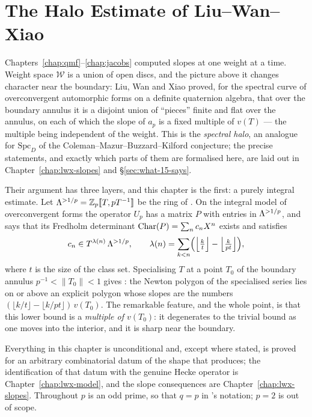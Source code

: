 \chapter{The Halo Estimate of Liu--Wan--Xiao}
\label{chap:lwx-halo}

Chapters~\ref{chap:qmf}--\ref{chap:jacobs} computed slopes at one weight at a time.  Weight space
$\mathcal{W}$ is a union of open discs, and the picture above it changes character near the
boundary: Liu, Wan and Xiao \cite{LWX} proved, for the spectral curve of overconvergent
automorphic forms on a definite quaternion algebra, that over the boundary annulus it is a
disjoint union of ``pieces'' finite and flat over the annulus, on each of which the slope of
$a_p$ is a fixed multiple of $v(T)$ --- the multiple being independent of the weight.  This is
the \emph{spectral halo}, an analogue for $\mathrm{Spc}_D$ of the Coleman--Mazur--Buzzard--Kilford
conjecture; the precise statements, and exactly which parts of them are formalised here, are
laid out in Chapter~\ref{chap:lwx-slopes} and \S\ref{sec:what-15-says}.

Their argument has three layers, and this chapter is the first: a purely integral estimate.
Let $\Lambda^{>1/p} = \mathbb{Z}_p\llbracket T, pT^{-1}\rrbracket$ be the ring of \cite[Lemma 3.15]{LWX}.  On the
integral model of overconvergent forms the operator $U_p$ has a matrix $P$ with entries in
$\Lambda^{>1/p}$, and \cite[Theorem 3.16]{LWX} says that its Fredholm determinant
$\operatorname{Char}(P) = \sum_n c_n X^n$ exists and satisfies
\[
  c_n \in T^{\lambda(n)}\,\Lambda^{>1/p}, \qquad
  \lambda(n) = \sum_{k<n}\Bigl(\Bigl\lfloor \tfrac{k}{t}\Bigr\rfloor -
  \Bigl\lfloor \tfrac{k}{pt}\Bigr\rfloor\Bigr),
\]
where $t$ is the size of the class set.  Specialising $T$ at a point $T_0$ of the boundary
annulus $p^{-1} < \lVert T_0\rVert < 1$ gives \cite[Corollary 3.18]{LWX}: the Newton polygon of
the specialised series lies on or above an explicit polygon whose slopes are the numbers
$(\lfloor k/t\rfloor - \lfloor k/pt\rfloor)\,v(T_0)$.  The remarkable feature, and the whole
point, is that this lower bound is a \emph{multiple of $v(T_0)$}: it degenerates to the trivial
bound as one moves into the interior, and it is sharp near the boundary.

Everything in this chapter is unconditional and, except where stated, is proved for an arbitrary
combinatorial datum of the shape that \cite[Proposition 3.1]{LWX} produces; the identification of
that datum with the genuine Hecke operator is Chapter~\ref{chap:lwx-model}, and the slope
consequences are Chapter~\ref{chap:lwx-slopes}.  Throughout $p$ is an odd prime, so that
$q = p$ in \cite{LWX}'s notation; $p = 2$ is out of scope.


